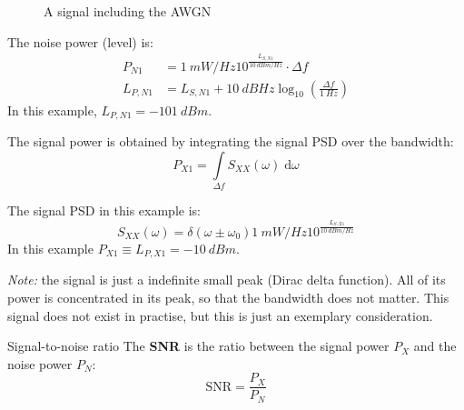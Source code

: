\begin{refsection}
\begin{figure}[H]
	\caption[A signal including the AWGN]{A signal including the \ac{AWGN}}
\end{figure}

The noise power (level) is:
\begin{equation}
	\begin{split}
		P_{N1} &= \SI{1}{mW/Hz} 10^{\frac{L_{S,N1}}{\SI{10}{dBm/Hz}}} \cdot \Delta f \\
		L_{P,N1} &= L_{S,N1} + \SI{10}{dBHz} \log_{10} \left(\frac{\Delta f}{\SI{1}{Hz}}\right)
	\end{split}
\end{equation}
In this example, $L_{P,N1} = \SI{-101}{dBm}$.

The signal power is obtained by integrating the signal \ac{PSD} over the bandwidth:
\begin{equation}
	P_{X1} = \int\limits_{\Delta f} S_{XX}(\omega) \; \mathrm{d} \omega
\end{equation}

The signal \ac{PSD} in this example is:
\begin{equation*}
	S_{XX}(\omega) = \delta(\omega \pm \omega_0) \SI{1}{mW/Hz} 10^{\frac{L_{S,X1}}{\SI{10}{dBm/Hz}}}
\end{equation*}
In this example $P_{X1} \equiv L_{P,X1} = \SI{-10}{dBm}$.

\textit{Note:} the signal is just a indefinite small peak (Dirac delta function). All of its power is concentrated in its peak, so that the bandwidth does not matter. This signal does not exist in practise, but this is just an exemplary consideration.

\begin{definition}{Signal-to-noise ratio}
	The  \textbf{\ac{SNR}} is the ratio between the signal power $P_{X}$ and the noise power $P_{N}$:
	\begin{equation}
		\mathrm{SNR} = \frac{P_{X}}{P_{N}}
	\end{equation}%
	

\end{definition}
\end{refsection}
